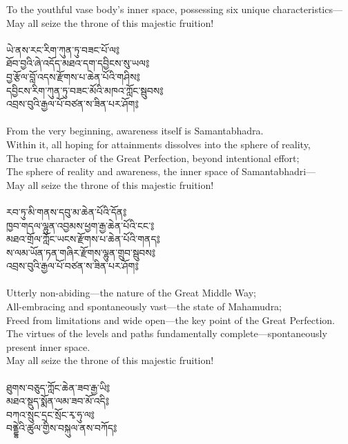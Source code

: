 To the youthful vase body’s inner space, possessing six unique characteristics—\\
May all seize the throne of this majestic fruition!\\
\\
\newpage
\ti ཡེ་ནས་རང་རིག་ཀུན་ཏུ་བཟང་པོ་ལ༔\\
ཐོབ་བྱའི་ཞེ་འདོད་མཐའ་དག་དབྱིངས་སུ་ཡལ༔\\
བྱ་རྩོལ་བློ་འདས་རྫོགས་པ་ཆེན་པོའི་གཤིས༔\\
དབྱིངས་རིག་ཀུན་ཏུ་བཟང་མོའི་མཁའ་ཀློང་སྦུབས༔\\
འབྲས་བུའི་རྒྱལ་པོ་བཙན་ས་ཟིན་པར་ཤོག༔\\
\\
\ru From the very beginning, awareness itself is Samantabhadra.\\
Within it, all hoping for attainments dissolves into the sphere of reality,\\
The true character of the Great Perfection, beyond intentional effort;\\
The sphere of reality and awareness, the inner space of Samantabhadri—\\
May all seize the throne of this majestic fruition!\\
\\
\ti རབ་ཏུ་མི་གནས་དབུ་མ་ཆེན་པོའི་དོན༔\\
ཁྱབ་གདལ་ལྷུན་འབྱམས་ཕྱག་རྒྱ་ཆེན་པོའི་ངང༌༔\\
མཐའ་གྲོལ་ཀློང་ཡངས་རྫོགས་པ་ཆེན་པོའི་གནད༔\\
ས་ལམ་ཡོན་ཏན་གཞིར་རྫོགས་ལྷུན་གྲུབ་སྦུབས༔\\
འབྲས་བུའི་རྒྱལ་པོ་བཙན་ས་ཟིན་པར་ཤོག༔\\
\\
\ru Utterly non-abiding—the nature of the Great Middle Way;\\
All-embracing and spontaneously vast—the state of Mahamudra;\\
Freed from limitations and wide open—the key point of the Great Perfection.\\
The virtues of the levels and paths fundamentally complete—spontaneously present inner space.\\
May all seize the throne of this majestic fruition!\\
\\
\newpage
\ti ཐུགས་བཅུད་ཀློང་ཆེན་ཟབ་རྒྱ་ཡི༔\\
མཐའ་སྡུད་སྨོན་ལམ་ཟབ་མོ་འདི༔\\
བཀའ་སྲུང་དྲང་སྲོང་རྭ་ཧུ་ལ༔\\
བནྡྷེའི་ཚུལ་གྱིས་བསྐུལ་ནས་བཀོད༔\\
